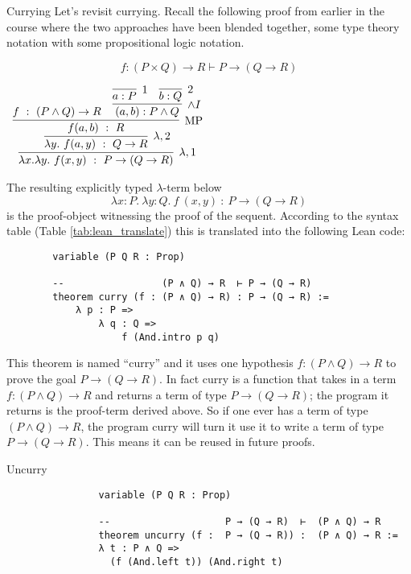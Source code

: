 \documentclass{book}
\begin{document}
    \begin{eg}{Currying} Let's revisit currying. Recall the following proof from earlier in the course where the two approaches have been blended together, some type theory notation with some propositional logic notation.

    $$f : (P\times Q) \rightarrow  R \vdash  P \rightarrow (Q \rightarrow  R)$$		    
        \begin{center}
            $\begin{array}{c}
                \infer[\lambda,1]{\lambda x. \lambda y. \ f(x,y) \ : \ P\to(Q\to R)}
                    {\infer[\lambda,2]{\lambda y. \ f(a,y) \ : \ Q\to R}
                        {\infer[\MP]{f(a,b) \ : \ R}
                            {f \ : \ (P\land Q) \to R
                            &
                            \infer[\land I]{(a,b) : P\land Q}
                                {\infer[1]{a:P}{}
                                &
                                \infer[2]{b:Q}{}}}}}
            \end{array}$
        \end{center}    

    The resulting explicitly typed $\lambda$-term below
    $$ \lambda x : P. \ \lambda y : Q. \ f \ (x,y) \ : \ P \to (Q \to R)$$
    is the proof-object witnessing the proof of the sequent. According to the syntax table (Table \ref{tab:lean_translate}) this is translated into the following Lean code:

    \begin{lstlisting}
        variable (P Q R : Prop)

        --                 (P ∧ Q) → R  ⊢ P → (Q → R)
        theorem curry (f : (P ∧ Q) → R) : P → (Q → R) :=
            λ p : P =>
                λ q : Q =>
                    f (And.intro p q)
    \end{lstlisting}

    This theorem is named ``curry'' and it uses one hypothesis $f : (P \land Q) \to R$ to prove the goal $P \to (Q \to R)$. In fact curry is a function that takes in a term $f : (P \land Q) \to R$ and returns a term of type $P \to (Q \to R)$; the program it returns is the proof-term derived above. So if one ever has a term of type $(P \land Q) \to R$, the program curry will turn it use it to write a term of type $P \to (Q \to R)$. This means it can be reused in future proofs.
    \end{eg}

    \begin{eg}{Uncurry}
            \begin{lstlisting}
                variable (P Q R : Prop)

                --                    P → (Q → R)  ⊢  (P ∧ Q) → R 
                theorem uncurry (f :  P → (Q → R)) :  (P ∧ Q) → R :=
                λ t : P ∧ Q =>
                  (f (And.left t)) (And.right t)
            \end{lstlisting}
    \end{eg}
\end{document}
